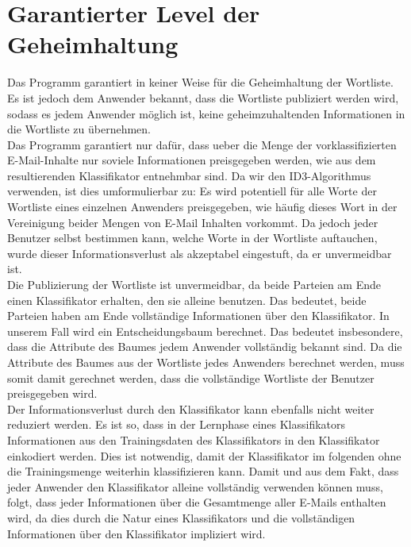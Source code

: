 \documentclass{article}
\begin{document}
\section{Garantierter Level der Geheimhaltung}
  Das Programm garantiert in keiner Weise f\"ur die Geheimhaltung der
Wortliste. Es ist jedoch dem Anwender bekannt, dass die Wortliste publiziert
werden wird, sodass es jedem Anwender m\"oglich ist, keine geheimzuhaltenden
Informationen in die Wortliste zu \"ubernehmen.\\
  Das Programm garantiert nur daf\"ur, dass ueber die Menge der
vorklassifizierten E-Mail-Inhalte nur soviele Informationen preisgegeben
werden, wie aus dem resultierenden Klassifikator entnehmbar sind. Da
wir den ID3-Algorithmus verwenden, ist dies umformulierbar zu: Es wird 
potentiell f\"ur alle Worte der Wortliste eines einzelnen Anwenders 
preisgegeben, wie h\"aufig dieses Wort in der Vereinigung beider 
Mengen von E-Mail Inhalten vorkommt.
  Da jedoch jeder Benutzer selbst bestimmen kann, welche Worte in der 
Wortliste auftauchen, wurde dieser Informationsverlust als akzeptabel 
eingestuft, da er unvermeidbar ist.\\
  Die Publizierung der Wortliste ist unvermeidbar, da beide Parteien am
Ende einen Klassifikator erhalten, den sie alleine benutzen.
Das bedeutet, beide Parteien haben am Ende vollst\"andige Informationen
\"uber den Klassifikator.
  In unserem Fall wird ein Entscheidungsbaum berechnet. 
  Das bedeutet insbesondere, dass die Attribute des Baumes jedem Anwender
vollst\"andig bekannt sind.
  Da die Attribute des Baumes aus der Wortliste jedes Anwenders berechnet
werden, muss somit damit gerechnet werden, dass die vollst\"andige
Wortliste der Benutzer preisgegeben wird.\\
  Der Informationsverlust durch den Klassifikator kann ebenfalls nicht 
weiter reduziert werden.
  Es ist so, dass in der Lernphase eines Klassifikators Informationen aus
den Trainingsdaten des Klassifikators in den Klassifikator einkodiert
werden.
  Dies ist notwendig, damit der Klassifikator im folgenden ohne die
Trainingsmenge weiterhin klassifizieren kann.
  Damit und aus dem Fakt, dass jeder Anwender den Klassifikator alleine
vollst\"andig verwenden k\"onnen muss, folgt, dass jeder Informationen
\"uber die Gesamtmenge aller E-Mails enthalten wird, da dies durch die 
Natur eines Klassifikators und die vollst\"andigen Informationen \"uber
den Klassifikator impliziert wird.
\end{document}
